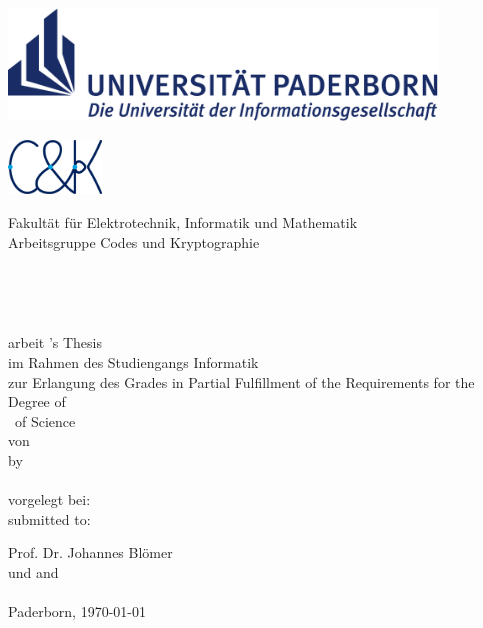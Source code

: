 \thispagestyle{empty}
\begin{titlepage}
\begin{center}

	\begin{minipage}{14cm}
		\hspace*{1.9cm}
		\includegraphics[height=3cm]{figures/upb_logo}\\
		\hspace*{1.15cm}
		\begin{minipage}{2.8cm}
			\includegraphics[width=2.5cm]{figures/cuk_logo_2019}
		\end{minipage}
		\begin{minipage}{9.8cm}
			\vspace*{5pt}
			\textsf{%
			Fakultät für Elektrotechnik, Informatik und Mathematik \\
			Arbeitsgruppe Codes und Kryptographie
			}
		\end{minipage}
	\end{minipage}\\[60pt]

	\begin{doublespace}
		{\Huge\textbf{\Title}}\\[30pt]
	\end{doublespace}

	{\Large
		\ifgerman
			\Degree arbeit
		\else
			\Degree 's Thesis
		\fi
	}\\[6pt]
		\ifgerman
			im Rahmen des Studiengangs Informatik\\
			zur Erlangung des Grades
		\else
			in Partial Fulfillment of the Requirements for the\\
			Degree of
		\fi
		\\[6pt]
  	{\Large \Degree\ of Science}\\[54pt] %

	\ifgerman
		von\\
	\else
		by\\
	\fi
	{\scshape\large \Author}\\[54pt]

	\ifgerman
		vorgelegt bei:\\
	\else
		submitted to:\\
	\fi

	{\large Prof. Dr. Johannes Blömer \\
	\ifgerman
		und
	\else
		and
	\fi
	\\[6pt]
	\large \SecondExaminer}\\[30pt]

	{Paderborn, \today}

\end{center}
\end{titlepage}
\clearpage
